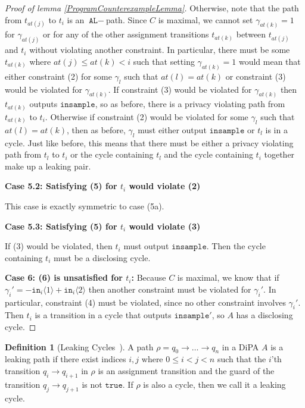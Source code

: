 \documentclass[12pt]{article}
\newcommand{\brangle}[1]{\langle#1 \rangle}
\theoremstyle{definition}
\newtheorem{defn}[thm]{Definition}
\begin{document}
\begin{proof}[Proof of lemma \ref{ProgramCounterexampleLemma}]
    Otherwise, note that the path from $t_{at(j)}$ to $t_i$ is an $\texttt{AL}-$path. Since $C$ is maximal, we cannot set $\gamma_{at(k)}=1$ for $\gamma_{at(j)}$ or for any of the other assignment transitions $t_{at(k)}$ between $t_{at(j)}$ and $t_i$ without violating another constraint. 
    In particular, there must be some $t_{at(k)}$ where $at(j)\leq at(k)<i$ such that setting $\gamma_{at(k)} = 1$ would mean that either constraint (2) for some $\gamma_l$ such that $at(l) = at(k)$ or constraint (3) would be violated for $\gamma_{at(k)}$. 
    If constraint (3) would be violated for $\gamma_{at(k)}$ then $t_{at(k)}$ outputs $\texttt{insample}$, so as before, there is a privacy violating path from $t_{at(k)}$ to $t_i$. Otherwise if constraint (2) would be violated for some $\gamma_l$ such that $at(l) = at(k)$, then as before, $\gamma_l$ must either output $\texttt{insample}$ or $t_l$ is in a cycle. 
    Just like before, this means that there must be either a privacy violating path from $t_l$ to $t_i$ or the cycle containing $t_l$ and the cycle containing $t_i$ together make up a leaking pair. 

    \textbf{Case 5.2: Satisfying (5) for $t_i$ would violate (2)}

    This case is exactly symmetric to case (5a).

    \textbf{Case 5.3: Satisfying (5) for $t_i$ would violate (3)}

    If (3) would be violated, then $t_i$ must output $\texttt{insample}$. Then the cycle containing $t_i$ must be a disclosing cycle. 
    
    \textbf{Case 6: (6) is unsatisfied for $t_i$:} Because $C$ is maximal, we know that if $\gamma_i' = -\texttt{in}_i\brangle{1}+\texttt{in}_i\brangle{2}$ then another constraint must be violated for $\gamma_i'$. In particular, constraint (4) must be violated, since no other constraint involves $\gamma_i'$. 
    Then $t_i$ is a transition in a cycle that outputs $\texttt{insample}'$, so $A$ has a disclosing cycle.
\end{proof}


\begin{defn}[Leaking Cycles~\cite{chadhaLinearTimeDecidability2021}]
    A path $\rho = q_0\to\ldots \to q_n$ in a DiPA $A$ is a leaking path if there exist indices $i, j$ where $0\leq i < j < n$ such that the $i$'th transition $q_i\to q_{i+1}$ in $\rho$ is an assignment transition and the guard of the transition $q_j \to q_{j+1}$ is not $\texttt{true}$. If $\rho$ is also a cycle, then we call it a leaking cycle.
\end{defn}
\end{document}
